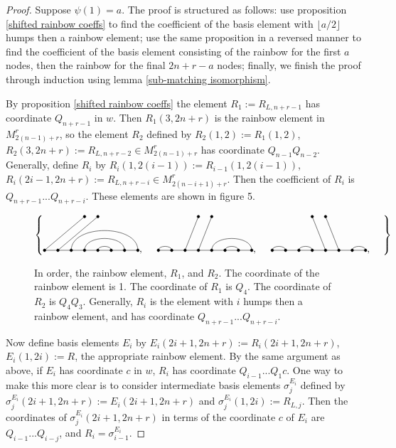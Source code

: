 \documentclass{amsart}
\begin{document}
\begin{proof}
	Suppose $\psi(1)=a$. The proof is structured as follows: use proposition \ref{shifted rainbow coeffs} to find the coefficient of the basis element with $\lfloor a/2\rfloor$ humps then a rainbow element; use the same proposition in a reversed manner to find the coefficient of the basis element consisting of the rainbow for the first $a$ nodes, then the rainbow for the final $2n+r-a$ nodes; finally, we finish the proof through induction using lemma \ref{sub-matching isomorphism}.
	
	\vspace{2mm}
	By proposition \ref{shifted rainbow coeffs} the element $R_1:=R_{L,n+r-1}$ has coordinate $Q_{n+r-1}$ in $w$. Then $R_1(3,2n+r)$ is the rainbow element in  $M_{2(n-1)+r}^r$, so the element $R_2$ defined by $R_2(1,2):=R_1(1,2)$, $R_2(3,2n+r):=R_{L,n+r-2}\in M_{2(n-1)+r}^r$ has coordinate $Q_{n-1}Q_{n-2}$. Generally, define $R_i$ by $R_i(1,2(i-1)):=R_{i-1}(1,2(i-1))$, $R_i(2i-1,2n+r):=R_{L,n+r-i}\in M_{2(n-i+1)+r}^r$. Then the coefficient of $R_i$ is $Q_{n+r-1}...Q_{n+r-i}$. These elements are shown in figure 5.
	
	\begin{figure}
		\def\cbasisspacing{5mm}
		
		$\cbr{
			\begin{gathered}
			\GeneralizedMatching{8}{3/8, 4/7,5/6}{2}{1/1,2/2}{5/4}, \hspace{\cbasisspacing}
			\GeneralizedMatching{8}{1/2, 5/8,6/7}{2}{3/1,4/2}{5/4}, 
			\hspace{\cbasisspacing}
			\GeneralizedMatching{8}{1/2, 3/4,7/8}{2}{5/1,6/2}{5/4}, \hspace{\cbasisspacing}
			\end{gathered}}$ 
		\caption{In order, the rainbow element, $R_1$, and $R_2$. The coordinate of the rainbow element is 1. The coordinate of $R_1$ is $Q_{4}$. The coordinate of $R_2$ is $Q_4Q_3$. Generally, $R_i$ is the element with $i$ humps then a rainbow element, and has coordinate $Q_{n+r-1}...Q_{n+r-i}$.}
	\end{figure}
	
	Now define basis elements $E_i$ by $E_i(2i+1,2n+r):=R_i(2i+1,2n+r)$, $E_i(1,2i):=R$, the appropriate rainbow element. By the same argument as above, if $E_i$ has coordinate $c$ in $w$, $R_i$ has coordinate $Q_{i-1}...Q_{1}c$. One way to make this more clear is to consider intermediate basis elements $\sigma_j^{E_i}$ defined by $\sigma_j^{E_i}(2i+1,2n+r):=E_i(2i+1,2n+r)$ and $\sigma_j^{E_i}(1,2i):=R_{L,j}$. Then the coordinates of $\sigma_j^{E_i}(2i+1,2n+r)$ in terms of the coordinate $c$ of $E_i$ are $Q_{i-1}...Q_{i-j}$, and $R_i=\sigma_{i-1}^{E_i}$. 
	

\end{proof}
\end{document}
